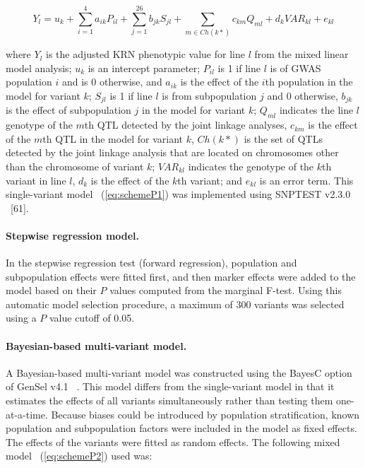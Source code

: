 \documentclass[10pt,letterpaper]{article}
\begin{document}
\begin{equation}\label{eq:schemeP1} 
Y_l = u_k + \sum_{i=1}^{4}a_{ik}P_{il} + \sum_{j=1}^{26} b_{jk}S_{jl} + \sum_{m \in Ch(k*)}c_{km}Q_{ml} + d_kVAR_{kl} + e_{kl}
\end{equation}


where $Y_l$ is the adjusted KRN phenotypic value for line $l$ from the mixed linear model analysis; $u_k$ is an intercept parameter; $P_{il}$ is 1 if line $l$ is of GWAS population $i$ and is 0 otherwise, and $a_{ik}$ is the effect of the $i$th population in the model for variant $k$; $S_{jl}$ is 1 if line $l$ is from subpopulation $j$ and 0 otherwise, $b_{jk}$ is the effect of subpopulation $j$ in the model for variant $k$; $Q_{ml}$ indicates the line $l$ genotype of the $m$th QTL detected by the joint linkage analyses, $c_{km}$ is the effect of the $m$th QTL in the model for variant $k$, $Ch(k*)$ is the set of QTLs detected by the joint linkage analysis that are located on chromosomes other than the chromosome of variant $k$; $VAR_{kl}$ indicates the genotype of the $k$th variant in line $l$, $d_k$ is the effect of the $k$th variant; and $e_{kl}$ is an error term. This single-variant model ~(\ref{eq:schemeP1}) was implemented using SNPTEST v2.3.0 ~\cite{Marchini2010}[61].

\paragraph{Stepwise regression model.} 
In the stepwise regression test (forward regression), population and subpopulation effects were fitted first, and then marker effects were added to the model based on their $P$ values computed from the marginal F-test. Using this automatic model selection procedure, a maximum of 300 variants was selected using a $P$ value cutoff of 0.05.

\paragraph{Bayesian-based multi-variant model.} 
A Bayesian-based multi-variant model was constructed using the BayesC option of GenSel v4.1 ~\cite{Habier2011}. This model differs from the single-variant model in that it estimates the effects of all variants simultaneously rather than testing them one-at-a-time. Because biases could be introduced by population stratification, known population and subpopulation factors were included in the model as fixed effects. The effects of the variants were fitted as random effects. The following mixed model ~(\ref{eq:schemeP2}) used was:  
\end{document}

